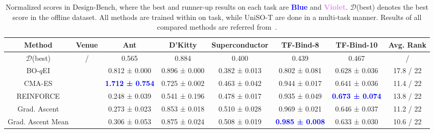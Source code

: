 \begin{table}[t!]
    \caption{Normalized scores in Design-Bench, where the best and runner-up results on each task are \textbf{\textcolor{blue}{Blue}} and \textbf{\textcolor{violet}{Violet}}. $\mathcal{D}$(best) denotes the best score in the offline dataset. All methods are trained within on task, while UniSO-T are done in a multi-task manner. Results of all compared methods are referred from~\citep{tan2024offline-ltr}.}\vspace{0.3em}
    \centering
    \resizebox{\linewidth}{!}
    {\begin{tabular}{c|c|ccccc|c}
    \toprule
    Method  &  Venue    & Ant                                        & D'Kitty                                    & Superconductor                             & TF-Bind-8                                 & TF-Bind-10                                  & Avg. Rank                                         \\  \midrule 
    $\mathcal{D}$(best) & / & 0.565 & 0.884 & 0.400 & 0.439 & 0.467 & /  \\ \midrule
    BO-$q$EI  &          & 0.812 ± 0.000                              & 0.896 ± 0.000                              & 0.382 ± 0.013                              & 0.802 ± 0.081                              & 0.628 ± 0.036                              & 17.8 / 22                             \\
    CMA-ES            & &\textbf{\textcolor{blue}{1.712 ± 0.754}}   & 0.725 ± 0.002                              & 0.463 ± 0.042                              & 0.944 ± 0.017                              & 0.641 ± 0.036                              & 11.4 / 22                             \\
    REINFORCE     &    & 0.248 ± 0.039                              & 0.541 ± 0.196                              & 0.478 ± 0.017                              & 0.935 ± 0.049                              & \textbf{\textcolor{blue}{0.673 ± 0.074}} & 13.8 / 22                             \\
    Grad. Ascent  &    & 0.273 ± 0.023                              & 0.853 ± 0.018                              & 0.510 ± 0.028                              & 0.969 ± 0.021                              & 0.646 ± 0.037                              & 11.2 / 22                             \\
    Grad. Ascent Mean & &0.306 ± 0.053                              & 0.875 ± 0.024                              & 0.508 ± 0.019                              & \textbf{\textcolor{blue}{0.985 ± 0.008}}   & 0.633 ± 0.030                              & 10.6 / 22                             \\

\end{tabular}}
\end{table}
